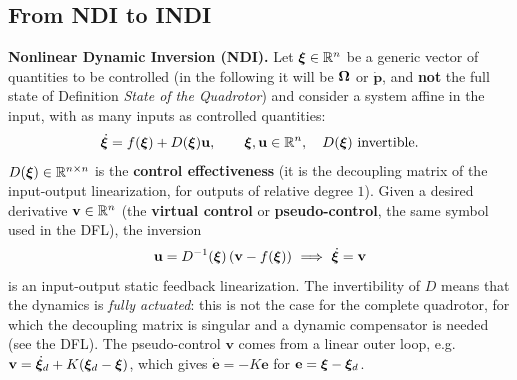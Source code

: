 \documentclass[10pt, a4paper]{report}
\begin{document}
\subsection{From NDI to INDI}
\noindent\textbf{Nonlinear Dynamic Inversion (NDI).} Let ${\boldsymbol{\xi}}\in{\mathbb R}^n$ be a generic vector of quantities to be controlled (in the following it will be ${\boldsymbol{\Omega}}$ or $\dot{\mathbf p}$, and \textbf{not} the full state of Definition \textit{State of the Quadrotor}) and consider a system affine in the input, with as many inputs as controlled quantities:\begin{equation}\label{indi_system}
    \dot{{\boldsymbol{\xi}}}=f({\boldsymbol{\xi}})+D({\boldsymbol{\xi}})\mathbf u,\qquad {\boldsymbol{\xi}},\mathbf u\in{\mathbb R}^n,\quad D({\boldsymbol{\xi}})\ \text{invertible}.
\end{equation}
$D({\boldsymbol{\xi}})\in{\mathbb R}^{n\times n}$ is the \textbf{control effectiveness} (it is the decoupling matrix of the input-output linearization, for outputs of relative degree $1$). Given a desired derivative $\mathbf v\in{\mathbb R}^n$ (the \textbf{virtual control} or \textbf{pseudo-control}, the same symbol used in the DFL), the inversion
\begin{equation}\label{ndi_law}
    \mathbf u=D^{-1}(\bxi)\left(\mathbf v-f(\bxi)\right)\ \Longrightarrow\ \dot{\bxi}=\mathbf v
\end{equation}
is an input-output static feedback linearization. The invertibility of $D$ means that the dynamics is \textit{fully actuated}: this is not the case for the complete quadrotor, for which the decoupling matrix is singular and a dynamic compensator is needed (see the DFL). The pseudo-control $\mathbf v$ comes from a linear outer loop, e.g. $\mathbf v=\dot{{\boldsymbol{\xi}}}_d+K({\boldsymbol{\xi}}_d-{\boldsymbol{\xi}})$, which gives $\dot{\mathbf e}=-K\mathbf e$ for $\mathbf e={\boldsymbol{\xi}}-{\boldsymbol{\xi}}_d$.\bigskip
\end{document}
